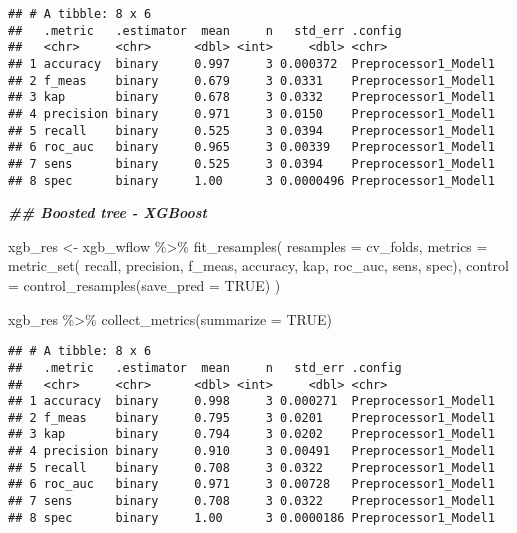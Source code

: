 \documentclass[
]{article}
\newenvironment{Shaded}{\begin{snugshade}}{\end{snugshade}}
\newcommand{\AttributeTok}[1]{\textcolor[rgb]{0.77,0.63,0.00}{#1}}
\newcommand{\ConstantTok}[1]{\textcolor[rgb]{0.00,0.00,0.00}{#1}}
\newcommand{\DocumentationTok}[1]{\textcolor[rgb]{0.56,0.35,0.01}{\textbf{\textit{#1}}}}
\newcommand{\FunctionTok}[1]{\textcolor[rgb]{0.00,0.00,0.00}{#1}}
\newcommand{\NormalTok}[1]{#1}
\newcommand{\OtherTok}[1]{\textcolor[rgb]{0.56,0.35,0.01}{#1}}
\newcommand{\SpecialCharTok}[1]{\textcolor[rgb]{0.00,0.00,0.00}{#1}}
\begin{document}
\begin{verbatim}
## # A tibble: 8 x 6
##   .metric   .estimator  mean     n   std_err .config             
##   <chr>     <chr>      <dbl> <int>     <dbl> <chr>               
## 1 accuracy  binary     0.997     3 0.000372  Preprocessor1_Model1
## 2 f_meas    binary     0.679     3 0.0331    Preprocessor1_Model1
## 3 kap       binary     0.678     3 0.0332    Preprocessor1_Model1
## 4 precision binary     0.971     3 0.0150    Preprocessor1_Model1
## 5 recall    binary     0.525     3 0.0394    Preprocessor1_Model1
## 6 roc_auc   binary     0.965     3 0.00339   Preprocessor1_Model1
## 7 sens      binary     0.525     3 0.0394    Preprocessor1_Model1
## 8 spec      binary     1.00      3 0.0000496 Preprocessor1_Model1
\end{verbatim}

\begin{Shaded}
\begin{Highlighting}[]
\DocumentationTok{\#\# Boosted tree {-} XGBoost}

\NormalTok{xgb\_res }\OtherTok{\textless{}{-}} 
\NormalTok{  xgb\_wflow }\SpecialCharTok{\%\textgreater{}\%} 
  \FunctionTok{fit\_resamples}\NormalTok{(}
    \AttributeTok{resamples =}\NormalTok{ cv\_folds, }
    \AttributeTok{metrics =} \FunctionTok{metric\_set}\NormalTok{(}
\NormalTok{      recall, precision, f\_meas, }
\NormalTok{      accuracy, kap,}
\NormalTok{      roc\_auc, sens, spec),}
    \AttributeTok{control =} \FunctionTok{control\_resamples}\NormalTok{(}\AttributeTok{save\_pred =} \ConstantTok{TRUE}\NormalTok{)}
\NormalTok{    ) }

\NormalTok{xgb\_res }\SpecialCharTok{\%\textgreater{}\%} \FunctionTok{collect\_metrics}\NormalTok{(}\AttributeTok{summarize =} \ConstantTok{TRUE}\NormalTok{)}
\end{Highlighting}
\end{Shaded}

\begin{verbatim}
## # A tibble: 8 x 6
##   .metric   .estimator  mean     n   std_err .config             
##   <chr>     <chr>      <dbl> <int>     <dbl> <chr>               
## 1 accuracy  binary     0.998     3 0.000271  Preprocessor1_Model1
## 2 f_meas    binary     0.795     3 0.0201    Preprocessor1_Model1
## 3 kap       binary     0.794     3 0.0202    Preprocessor1_Model1
## 4 precision binary     0.910     3 0.00491   Preprocessor1_Model1
## 5 recall    binary     0.708     3 0.0322    Preprocessor1_Model1
## 6 roc_auc   binary     0.971     3 0.00728   Preprocessor1_Model1
## 7 sens      binary     0.708     3 0.0322    Preprocessor1_Model1
## 8 spec      binary     1.00      3 0.0000186 Preprocessor1_Model1
\end{verbatim}
\end{document}
